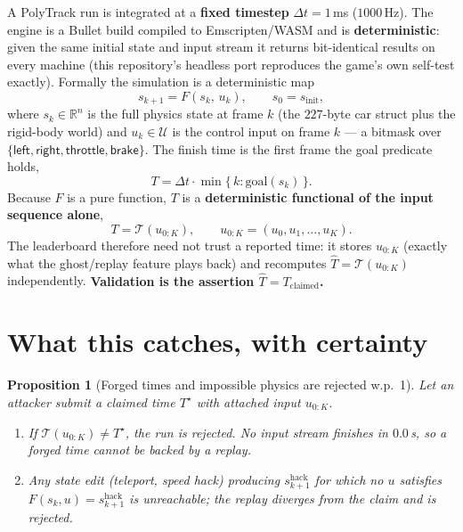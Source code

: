 \documentclass[11pt]{article}
\newtheorem{proposition}{Proposition}
\newcommand{\R}{\mathbb{R}}
\begin{document}
A PolyTrack run is integrated at a \textbf{fixed timestep} $\Delta t = 1$\,ms
($1000$\,Hz). The engine is a Bullet build compiled to Emscripten/WASM and is
\textbf{deterministic}: given the same initial state and input stream it returns
bit-identical results on every machine (this repository's headless port
reproduces the game's own self-test exactly). Formally the simulation is a
deterministic map
\begin{equation}
s_{k+1} = F\!\left(s_k,\, u_k\right), \qquad s_0 = s_{\text{init}},
\label{eq:step}
\end{equation}
where $s_k \in \R^{n}$ is the full physics state at frame $k$ (the $227$-byte car
struct plus the rigid-body world) and $u_k \in \mathcal{U}$ is the control input
on frame $k$ --- a bitmask over $\{\textsf{left},\textsf{right},\textsf{throttle},
\textsf{brake}\}$. The finish time is the first frame the goal predicate holds,
\begin{equation}
T = \Delta t \cdot \min\{\, k : \mathrm{goal}(s_k) \,\}.
\end{equation}
Because $F$ is a pure function, $T$ is a \textbf{deterministic functional of the
input sequence alone},
\begin{equation}
T = \mathcal{T}(u_{0:K}), \qquad u_{0:K} = (u_0, u_1, \dots, u_K).
\label{eq:functional}
\end{equation}
The leaderboard therefore need not trust a reported time: it stores $u_{0:K}$
(exactly what the ghost/replay feature plays back) and recomputes
$\hat T = \mathcal{T}(u_{0:K})$ independently. \textbf{Validation is the assertion
$\hat T = T_{\text{claimed}}$.}

\section{What this catches, with certainty}

\begin{proposition}[Forged times and impossible physics are rejected w.p.\ 1]
Let an attacker submit a claimed time $T^\star$ with attached input $u_{0:K}$.
\begin{enumerate}[label=(\alph*),nosep]
  \item If $\mathcal{T}(u_{0:K}) \neq T^\star$, the run is rejected. No input
        stream finishes in $0.0$\,s, so a forged time cannot be backed by a
        replay.
  \item Any state edit (teleport, speed hack) producing $s^{\text{hack}}_{k+1}$
        for which no $u$ satisfies $F(s_k,u)=s^{\text{hack}}_{k+1}$ is
        unreachable; the replay diverges from the claim and is rejected.
\end{enumerate}
\end{proposition}
\end{document}
